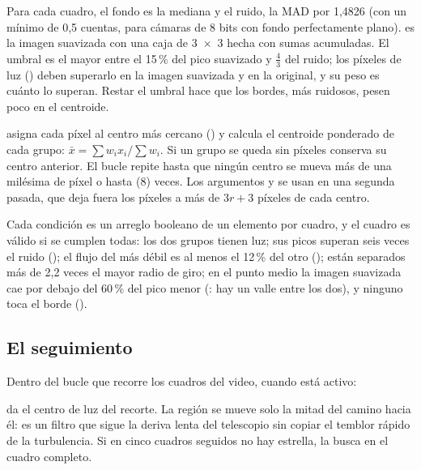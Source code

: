 
Para cada cuadro, el fondo  es la mediana y el ruido, la MAD por 1,4826 (con un mínimo de 0,5 cuentas, para
cámaras de 8 bits con fondo perfectamente plano).  es la imagen suavizada con una caja de 3~×~3 hecha con sumas
acumuladas. El umbral  es el mayor entre el 15\,\% del pico suavizado y $\frac43$ del ruido; los píxeles de
luz () deben superarlo en la imagen suavizada y en la original, y su peso  es cuánto lo superan.
Restar el umbral hace que los bordes, más ruidosos, pesen poco en el centroide.


 asigna cada píxel al centro más cercano () y calcula el centroide ponderado de
cada grupo: $\bar x = \sum w_i x_i / \sum w_i$. Si un grupo se queda sin píxeles conserva su centro anterior. El bucle
repite hasta que ningún centro se mueva más de una milésima de píxel o hasta  (8) veces. Los
argumentos  y  se usan en una segunda pasada, que deja fuera los píxeles a más de $3r + 3$
píxeles de cada centro.


Cada condición es un arreglo booleano de un elemento por cuadro, y el cuadro es válido si se cumplen todas: los dos
grupos tienen luz; sus picos superan seis veces el ruido (); el flujo del más débil es al menos el
12\,\% del otro (); están separados más de 2,2 veces el mayor radio de giro; en el punto
medio la imagen suavizada cae por debajo del 60\,\% del pico menor (: hay un valle entre los dos), y ninguno
toca el borde ().

\subsection*{El seguimiento}

Dentro del bucle que recorre los cuadros del video, cuando  está activo:


 da el centro de luz del recorte. La región se mueve solo la mitad del camino hacia él: es un filtro
que sigue la deriva lenta del telescopio sin copiar el temblor rápido de la turbulencia. Si en cinco cuadros seguidos no
hay estrella,  la busca en el cuadro completo.

